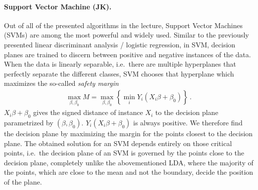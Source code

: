 \documentclass[12pt, a4paper]{scrartcl}
\begin{document}
\paragraph{Support Vector Machine (JK).} Out of all of the presented algorithms in the lecture, Support Vector Machines (SVMs) are among the most powerful and widely used. Similar to the previously presented linear discriminant analysis / logistic regression, in SVM, decision planes are trained to discern between positive and negative instances of the data. When the data is linearly separable, i.e.\  there are multiple hyperplanes that perfectly separate the different classes, SVM chooses that hyperplane which maximizes the so-called \emph{safety margin}
\begin{align}
	\max_{\beta, \beta_0} M = 	\max_{\beta, \beta_0} \left\{ \min_i Y_i ( X_i \beta + \beta_0) \right\} \, .
\end{align}
$X_i \beta + \beta_0$ gives the signed distance of instance $X_i$ to the decision plane parametrized by $(\beta, \beta_0)$. $Y_i (X_i \beta + \beta_0)$ is always positive. 
We therefore find the decision plane by maximizing the margin for the points closest to the decision plane. The obtained solution for an SVM depends entirely on those critical points, i.e.\  the decision plane of an SVM is governed by the points close to the decision plane, completely unlike the abovementioned LDA, where the majority of the points, which are close to the mean and not the boundary, decide the position of the plane. 
\end{document}
